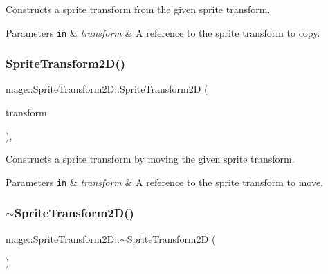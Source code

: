 Constructs a sprite transform from the given sprite transform.


\begin{DoxyParams}[1]{Parameters}
\mbox{\tt in}  & {\em transform} & A reference to the sprite transform to copy. \\
\hline
\end{DoxyParams}
\mbox{\label{classmage_1_1_sprite_transform2_d_a5c7324817bf4d99edbab3ed51e6bac21}} 
\subsubsection{\texorpdfstring{Sprite\+Transform2\+D()}{SpriteTransform2D()}\hspace{0.1cm}{\footnotesize\ttfamily [4/4]}}
{\footnotesize\ttfamily mage\+::\+Sprite\+Transform2\+D\+::\+Sprite\+Transform2D (\begin{DoxyParamCaption}\item[{\mbox{\hyperlink{classmage_1_1_sprite_transform2_d}{Sprite\+Transform2D}} \&\&}]{transform }\end{DoxyParamCaption})\hspace{0.3cm}{\ttfamily [default]}, {\ttfamily [noexcept]}}

Constructs a sprite transform by moving the given sprite transform.


\begin{DoxyParams}[1]{Parameters}
\mbox{\tt in}  & {\em transform} & A reference to the sprite transform to move. \\
\hline
\end{DoxyParams}
\mbox{\label{classmage_1_1_sprite_transform2_d_a8b80cdf066d1f74d9c6459faa531f0d2}} 
\subsubsection{\texorpdfstring{$\sim$\+Sprite\+Transform2\+D()}{~SpriteTransform2D()}}
{\footnotesize\ttfamily mage\+::\+Sprite\+Transform2\+D\+::$\sim$\+Sprite\+Transform2D (\begin{DoxyParamCaption}{ }\end{DoxyParamCaption})\hspace{0.3cm}{\ttfamily [default]}}

